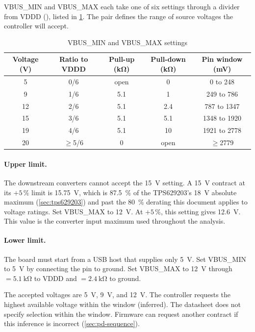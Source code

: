 VBUS\_MIN and VBUS\_MAX each take one of six settings through a divider from
VDDD (), listed in
\cref{tab:pd-vbus-settings}. The pair defines the range of source voltages the
controller will accept.

\begin{table}[htbp]
\centering
\caption{VBUS\_MIN and VBUS\_MAX settings}\label{tab:pd-vbus-settings}
\begin{tabular}{|c|c|c|c|c|}
\hline
\textbf{Voltage (V)} & \textbf{Ratio to VDDD} & \textbf{Pull-up (\si{\kilo\ohm})} & \textbf{Pull-down (\si{\kilo\ohm})} & \textbf{Pin window (mV)} \\
\hline
5 & 0/6 & open & 0 & 0 to 248 \\
\hline
9 & 1/6 & 5.1 & 1 & 249 to 786 \\
\hline
12 & 2/6 & 5.1 & 2.4 & 787 to 1347 \\
\hline
15 & 3/6 & 5.1 & 5.1 & 1348 to 1920 \\
\hline
19 & 4/6 & 5.1 & 10 & 1921 to 2778 \\
\hline
20 & $\geq$5/6 & 0 & open & $\geq$2779 \\
\hline
\end{tabular}
\end{table}

\paragraph{Upper limit.} The downstream converters cannot accept the
\SI{15}{\volt} setting. A
\SI{15}{\volt} contract at its $+5\,\%$ limit is \SI{15.75}{\volt}, which is
\SI{87.5}{\percent} of the TPS629203's \SI{18}{\volt} absolute maximum
(\cref{sec:tps629203}) and past the \SI{80}{\percent} derating this document
applies to voltage ratings. Set VBUS\_MAX to \SI{12}{\volt}. At $+5\,\%$, this
setting gives \SI{12.6}{\volt}. This value is the converter input maximum used
throughout the analysis.

\paragraph{Lower limit.} The board must start from a USB host that supplies
only \SI{5}{\volt}. Set VBUS\_MIN to \SI{5}{\volt} by connecting the pin to
ground. Set VBUS\_MAX to \SI{12}{\volt} through
 $= \SI{5.1}{\kilo\ohm}$ to VDDD and  $=
\SI{2.4}{\kilo\ohm}$ to ground.

The accepted voltages are \SI{5}{\volt}, \SI{9}{\volt}, and
\SI{12}{\volt}. The controller requests the highest available voltage within
the window (inferred). The datasheet does not specify selection within the
window. Firmware can request another contract if this inference is incorrect
(\cref{sec:pd-sequence}).

